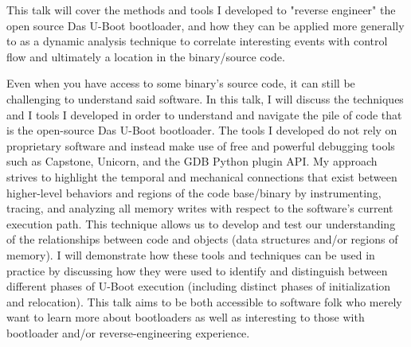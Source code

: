\def\abstracttitle{Bushwhacking your way around a bootloader}
\def\abstractcomment{Regular Talk}
\def\abstractowner{.bx}

\thispagestyle{abstract}

This talk will cover the methods and tools I developed to "reverse engineer" the open source Das U-Boot bootloader, and how they can be applied more generally to as a dynamic analysis technique to correlate interesting events with control flow and ultimately a location in the binary/source code.

Even when you have access to some binary's source code, it can still be challenging to understand said software. In this talk, I will discuss the techniques and I tools I developed in order to understand and navigate the pile of code that is the open-source Das U-Boot bootloader. The tools I developed do not rely on proprietary software and instead make use of free and powerful debugging tools such as Capstone, Unicorn, and the GDB Python plugin API. My approach strives to highlight the temporal and mechanical connections that exist between higher-level behaviors and regions of the code base/binary by instrumenting, tracing, and analyzing all memory writes with respect to the software's current execution path. This technique allows us to develop and test our understanding of the relationships between code and objects (data structures and/or regions of memory). I will demonstrate how these tools and techniques can be used in practice by discussing how they were used to identify and distinguish between different phases of U-Boot execution (including distinct phases of initialization and relocation). This talk aims to be both accessible to software folk who merely want to learn more about bootloaders as well as interesting to those with bootloader and/or reverse-engineering experience.
